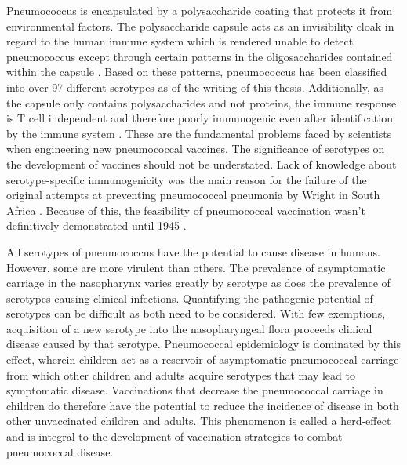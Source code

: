 \documentclass[]{book}
\theoremstyle{definition}
\theoremstyle{definition}
\theoremstyle{definition}
\theoremstyle{remark}
\begin{document}
Pneumococcus is encapsulated by a polysaccharide coating that protects
it from environmental factors. The polysaccharide capsule acts as an
invisibility cloak in regard to the human immune system which is
rendered unable to detect pneumococcus except through certain patterns
in the oligosaccharides contained within the capsule
\citep{Epstein1995}. Based on these patterns, pneumococcus has been
classified into over 97 different serotypes as of the writing of this
thesis. Additionally, as the capsule only contains polysaccharides and
not proteins, the immune response is T cell independent and therefore
poorly immunogenic even after identification by the immune system
\citep{Geno2015b}. These are the fundamental problems faced by
scientists when engineering new pneumococcal vaccines. The significance
of serotypes on the development of vaccines should not be understated.
Lack of knowledge about serotype-specific immunogenicity was the main
reason for the failure of the original attempts at preventing
pneumococcal pneumonia by Wright in South Africa \citep{Wright1914}.
Because of this, the feasibility of pneumococcal vaccination wasn't
definitively demonstrated until 1945 \citep{Macleod1945}.

All serotypes of pneumococcus have the potential to cause disease in
humans. However, some are more virulent than others. The prevalence of
asymptomatic carriage in the nasopharynx varies greatly by serotype as
does the prevalence of serotypes causing clinical infections.
Quantifying the pathogenic potential of serotypes can be difficult as
both need to be considered. With few exemptions, acquisition of a new
serotype into the nasopharyngeal flora proceeds clinical disease caused
by that serotype. Pneumococcal epidemiology is dominated by this effect,
wherein children act as a reservoir of asymptomatic pneumococcal
carriage from which other children and adults acquire serotypes that may
lead to symptomatic disease. Vaccinations that decrease the pneumococcal
carriage in children do therefore have the potential to reduce the
incidence of disease in both other unvaccinated children and adults.
This phenomenon is called a herd-effect and is integral to the
development of vaccination strategies to combat pneumococcal disease.
\end{document}

